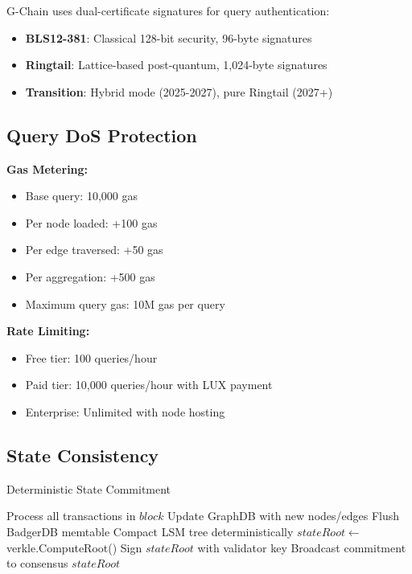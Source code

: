 \documentclass[11pt,a4paper]{article}
\begin{document}
G-Chain uses dual-certificate signatures for query authentication:

\begin{itemize}
\item \textbf{BLS12-381}: Classical 128-bit security, 96-byte signatures
\item \textbf{Ringtail}: Lattice-based post-quantum, 1,024-byte signatures
\item \textbf{Transition}: Hybrid mode (2025-2027), pure Ringtail (2027+)
\end{itemize}

\subsection{Query DoS Protection}

\textbf{Gas Metering:}
\begin{itemize}
\item Base query: 10,000 gas
\item Per node loaded: +100 gas
\item Per edge traversed: +50 gas
\item Per aggregation: +500 gas
\item Maximum query gas: 10M gas per query
\end{itemize}

\textbf{Rate Limiting:}
\begin{itemize}
\item Free tier: 100 queries/hour
\item Paid tier: 10,000 queries/hour with LUX payment
\item Enterprise: Unlimited with node hosting
\end{itemize}

\subsection{State Consistency}

\begin{algorithm}[H]
\caption{Deterministic State Commitment}
\begin{algorithmic}[1]
    \State Process all transactions in $block$
    \State Update GraphDB with new nodes/edges
    \State Flush BadgerDB memtable
    \State Compact LSM tree deterministically
    \State $stateRoot \gets$ verkle.ComputeRoot()
    \State Sign $stateRoot$ with validator key
    \State Broadcast commitment to consensus
    \State \Return $stateRoot$
\EndFunction
\end{algorithmic}
\end{algorithm}
\end{document}
